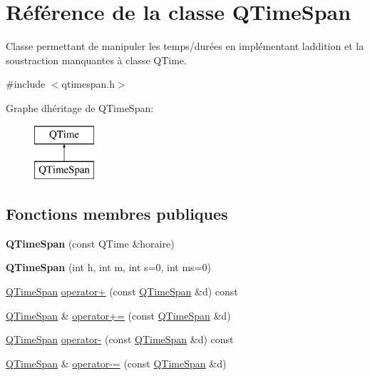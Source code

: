 \hypertarget{class_q_time_span}{}\section{Référence de la classe Q\+Time\+Span}
\label{class_q_time_span}


Classe permettant de manipuler les temps/durées en implémentant l\textquotesingle{}addition et la soustraction manquantes à classe Q\+Time.  




{\ttfamily \#include $<$qtimespan.\+h$>$}

Graphe d\textquotesingle{}héritage de Q\+Time\+Span\+:\begin{figure}[H]
\begin{center}
\leavevmode
\includegraphics[height=2.000000cm]{class_q_time_span}
\end{center}
\end{figure}
\subsection*{Fonctions membres publiques}
\begin{DoxyCompactItemize}
\item 
\hypertarget{class_q_time_span_a8cd29696e67c41f49f5a240e9e78cabe}{}{\bfseries Q\+Time\+Span} (const Q\+Time \&horaire)\label{class_q_time_span_a8cd29696e67c41f49f5a240e9e78cabe}

\item 
\hypertarget{class_q_time_span_a00f65e986fe17b60dd36cd028c19ce0f}{}{\bfseries Q\+Time\+Span} (int h, int m, int s=0, int ms=0)\label{class_q_time_span_a00f65e986fe17b60dd36cd028c19ce0f}

\item 
\hyperlink{class_q_time_span}{Q\+Time\+Span} \hyperlink{class_q_time_span_af687464e1116164d0c32c4655b024560}{operator+} (const \hyperlink{class_q_time_span}{Q\+Time\+Span} \&d) const 
\item 
\hyperlink{class_q_time_span}{Q\+Time\+Span} \& \hyperlink{class_q_time_span_a038fd914f077796445c578374d066fe5}{operator+=} (const \hyperlink{class_q_time_span}{Q\+Time\+Span} \&d)
\item 
\hyperlink{class_q_time_span}{Q\+Time\+Span} \hyperlink{class_q_time_span_a2a68d770016787234f2d4b1fb6e05335}{operator-\/} (const \hyperlink{class_q_time_span}{Q\+Time\+Span} \&d) const 
\item 
\hyperlink{class_q_time_span}{Q\+Time\+Span} \& \hyperlink{class_q_time_span_a68657d22a32edb47bd04776162038031}{operator-\/=} (const \hyperlink{class_q_time_span}{Q\+Time\+Span} \&d)
\end{DoxyCompactItemize}


